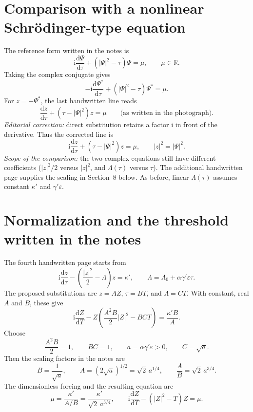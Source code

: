 \documentclass[11pt,a4paper]{article}
\newcommand{\dd}{\mathrm{d}}
\begin{document}
\section{Comparison with a nonlinear Schr\"odinger-type equation}
The reference form written in the notes is
\begin{equation}
\mathrm{i}\frac{\dd\Psi}{\dd\tau}+(|\Psi|^2-\tau)\Psi=\mu,
\qquad \mu\in\mathbb{R}.
\end{equation}
Taking the complex conjugate gives
\begin{equation}
-\mathrm{i}\frac{\dd\Psi^*}{\dd\tau}
+(|\Psi|^2-\tau)\Psi^*=\mu.
\end{equation}
For $z=-\Psi^*$, the last handwritten line reads
\begin{equation}
\frac{\dd z}{\dd\tau}+(\tau-|\Psi|^2)z=\mu
\qquad\text{(as written in the photograph).}
\end{equation}
\textit{Editorial correction:} direct substitution retains a factor
$\mathrm{i}$ in front of the derivative. Thus the corrected line is
\begin{equation}
\boxed{\mathrm{i}\frac{\dd z}{\dd\tau}+(\tau-|\Psi|^2)z=\mu,
\qquad |z|^2=|\Psi|^2.}
\end{equation}
\textit{Scope of the comparison:} the two complex equations still have
different coefficients ($|z|^2/2$ versus $|z|^2$, and $\Lambda(\tau)$ versus
$\tau$). The additional handwritten page supplies the scaling in
Section~8 below. As before, linear $\Lambda(\tau)$ assumes
constant $\kappa'$ and $\gamma'\varepsilon$.
\newpage
\section{Normalization and the threshold written in the notes}
The fourth handwritten page starts from
\begin{equation}
\mathrm{i}\frac{\dd z}{\dd\tau}
-\left(\frac{|z|^2}{2}-\Lambda\right)z=\kappa',
\qquad \Lambda=\Lambda_0+\alpha\gamma'\varepsilon\tau.
\end{equation}
The proposed substitutions are $z=AZ$, $\tau=BT$, and $\Lambda=CT$.
With constant, real $A$ and $B$, these give
\begin{equation}
\mathrm{i}\frac{\dd Z}{\dd T}
-Z\left(\frac{A^2B}{2}|Z|^2-BCT\right)=\frac{\kappa'B}{A}.
\end{equation}
Choose
\begin{equation}
\frac{A^2B}{2}=1,\qquad BC=1,
\qquad a=\alpha\gamma'\varepsilon>0,\qquad C=\sqrt a.
\end{equation}
Then the scaling factors in the notes are
\begin{equation}
B=\frac{1}{\sqrt a},\qquad
A=(2\sqrt a)^{1/2}=\sqrt{2}\,a^{1/4},\qquad
\frac{A}{B}=\sqrt{2}\,a^{3/4}.
\end{equation}
The dimensionless forcing and the resulting equation are
\begin{equation}
\mu=\frac{\kappa'}{A/B}=\frac{\kappa'}{\sqrt{2}\,a^{3/4}},
\qquad
\boxed{\mathrm{i}\frac{\dd Z}{\dd T}-(|Z|^2-T)Z=\mu.}
\end{equation}
\end{document}

